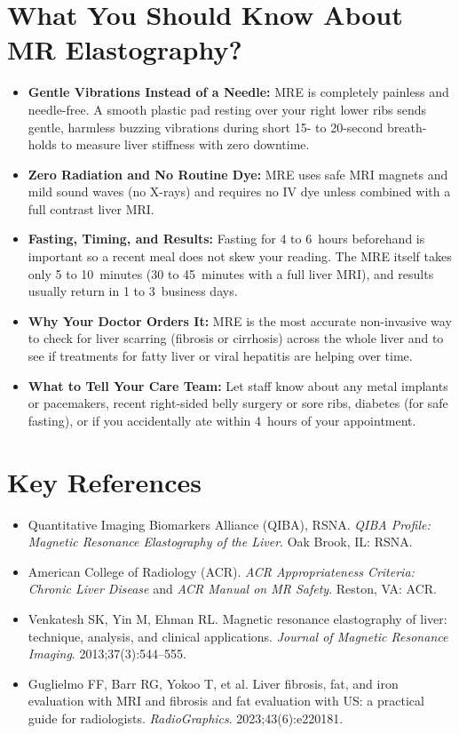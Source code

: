 \section{What You Should Know About MR Elastography?}
\begin{itemize}
\item \textbf{Gentle Vibrations Instead of a Needle:} MRE is completely painless and needle-free. A smooth plastic pad resting over your right lower ribs sends gentle, harmless buzzing vibrations during short 15- to 20-second breath-holds to measure liver stiffness with zero downtime.
\item \textbf{Zero Radiation and No Routine Dye:} MRE uses safe MRI magnets and mild sound waves (no X-rays) and requires no IV dye unless combined with a full contrast liver MRI.
\item \textbf{Fasting, Timing, and Results:} Fasting for 4 to 6~hours beforehand is important so a recent meal does not skew your reading. The MRE itself takes only 5 to 10~minutes (30 to 45~minutes with a full liver MRI), and results usually return in 1 to 3~business days.
\item \textbf{Why Your Doctor Orders It:} MRE is the most accurate non-invasive way to check for liver scarring (fibrosis or cirrhosis) across the whole liver and to see if treatments for fatty liver or viral hepatitis are helping over time.
\item \textbf{What to Tell Your Care Team:} Let staff know about any metal implants or pacemakers, recent right-sided belly surgery or sore ribs, diabetes (for safe fasting), or if you accidentally ate within 4~hours of your appointment.
\end{itemize}

\section{Key References}
\begin{itemize}
\item Quantitative Imaging Biomarkers Alliance (QIBA), RSNA. \textit{QIBA Profile: Magnetic Resonance Elastography of the Liver}. Oak Brook, IL: RSNA.
\item American College of Radiology (ACR). \textit{ACR Appropriateness Criteria: Chronic Liver Disease} and \textit{ACR Manual on MR Safety}. Reston, VA: ACR.
\item Venkatesh SK, Yin M, Ehman RL. Magnetic resonance elastography of liver: technique, analysis, and clinical applications. \textit{Journal of Magnetic Resonance Imaging}. 2013;37(3):544--555.
\item Guglielmo FF, Barr RG, Yokoo T, et al. Liver fibrosis, fat, and iron evaluation with MRI and fibrosis and fat evaluation with US: a practical guide for radiologists. \textit{RadioGraphics}. 2023;43(6):e220181.
\end{itemize}

